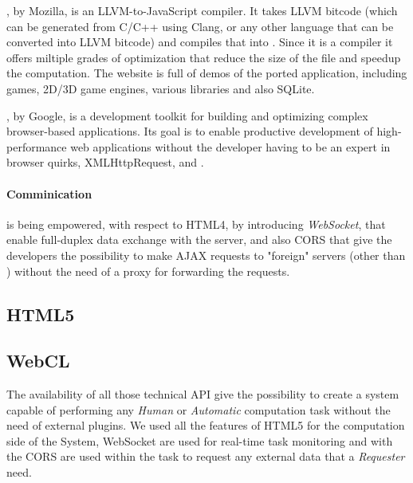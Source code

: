 , by Mozilla, is an LLVM-to-JavaScript compiler. It takes
LLVM bitcode (which can be generated from C/C++ using Clang, or any other
language that can be converted into LLVM bitcode) and compiles that into \js{}.
Since it is a compiler it offers miltiple grades of optimization that reduce the
size of the \js{} file and speedup the computation. The website is full of demos
of the ported application, including games, 2D/3D game engines, various libraries
and also SQLite.

, by Google, is a development toolkit for building and optimizing
complex browser-based applications. Its goal is to enable productive development
of high-performance web applications without the developer having to be an expert
in browser quirks, XMLHttpRequest, and \js{}.\\



\paragraph{Comminication} is being empowered, with respect to HTML4, by
introducing \emph{WebSocket}, that enable full-duplex data exchange with the server,
and also \ac{CORS} that give the developers the possibility to make \ac{AJAX}
requests to "foreign" servers (other than ) without the need of
a proxy for forwarding the requests.

\subsection{\acs{HTML}5}
\label{sec:bg:web:html5}



\subsection{WebCL}
\label{sec:bg:web:webcl}



The availability of all those technical API give the possibility to create a
system capable of performing any \emph{Human} or \emph{Automatic} computation
task without the need of external plugins. We used all the features of HTML5
for the computation side of the System, WebSocket are used for real-time task
monitoring and with the \ac{CORS} are used within the task to request any
external data that a \emph{Requester} need.
